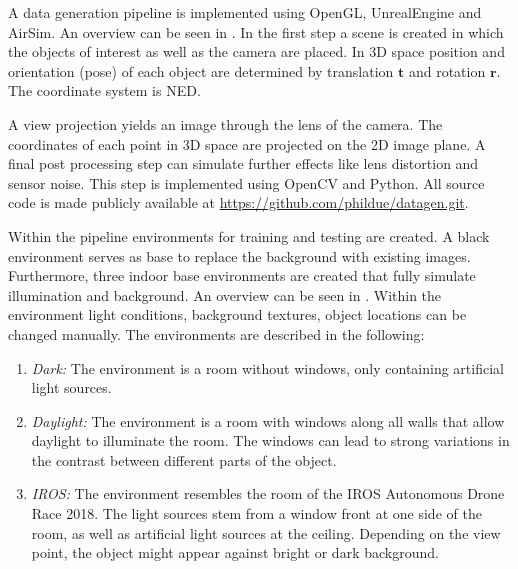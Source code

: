 A data generation pipeline is implemented using OpenGL, UnrealEngine and AirSim. An overview can be seen in . In the first step a scene is created in which the objects of interest as well as the camera are placed. In 3D space position and orientation (pose) of each object are determined by translation $\textbf{t}$ and rotation $\textbf{r}$. The coordinate system is \ac{NED}.

A view projection yields an image through the lens of the camera. The coordinates of each point in 3D space are projected on the 2D image plane. A final post processing step can simulate further effects like lens distortion and sensor noise. This step is implemented using OpenCV and Python. All source code is made publicly available at \url{https://github.com/phildue/datagen.git}.

Within the pipeline environments for training and testing are created. A black environment serves as base to replace the background with existing images. Furthermore, three indoor base environments are created that fully simulate illumination and background. An overview can be seen in . Within the environment light conditions, background textures, object locations can be changed manually. The environments are described in the following:

\begin{enumerate}
	\item \textit{Dark:} The environment is a room without windows, only containing artificial light sources. 
	\item \textit{Daylight:} The environment is a room with windows along all walls that allow daylight to illuminate the room. The windows can lead to strong variations in the contrast between different parts of the object.
	\item \textit{IROS:} The environment resembles the room of the \ac{IROS} Autonomous Drone Race 2018. The light sources stem from a window front at one side of the room, as well as artificial light sources at the ceiling. Depending on the view point, the object might appear against bright or dark background.
\end{enumerate}

